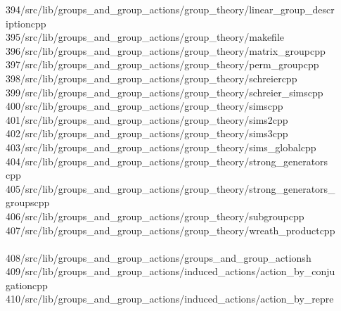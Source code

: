 \begin{tabbing}
394\>/src/lib/groups\_and\_group\_actions/group\_theory/linear\_group\_descr\\[0pt]
\>iptioncpp\\[0pt]
395\>/src/lib/groups\_and\_group\_actions/group\_theory/makefile\\[0pt]
396\>/src/lib/groups\_and\_group\_actions/group\_theory/matrix\_groupcpp\\[0pt]
397\>/src/lib/groups\_and\_group\_actions/group\_theory/perm\_groupcpp\\[0pt]
398\>/src/lib/groups\_and\_group\_actions/group\_theory/schreiercpp\\[0pt]
399\>/src/lib/groups\_and\_group\_actions/group\_theory/schreier\_simscpp\\[0pt]
400\>/src/lib/groups\_and\_group\_actions/group\_theory/simscpp\\[0pt]
401\>/src/lib/groups\_and\_group\_actions/group\_theory/sims2cpp\\[0pt]
402\>/src/lib/groups\_and\_group\_actions/group\_theory/sims3cpp\\[0pt]
403\>/src/lib/groups\_and\_group\_actions/group\_theory/sims\_globalcpp\\[0pt]
404\>/src/lib/groups\_and\_group\_actions/group\_theory/strong\_generators\\[0pt]
\>cpp\\[0pt]
405\>/src/lib/groups\_and\_group\_actions/group\_theory/strong\_generators\_\\[0pt]
\>groupscpp\\[0pt]
406\>/src/lib/groups\_and\_group\_actions/group\_theory/subgroupcpp\\[0pt]
407\>/src/lib/groups\_and\_group\_actions/group\_theory/wreath\_productcpp\\[0pt]
\>\\[0pt]
408\>/src/lib/groups\_and\_group\_actions/groups\_and\_group\_actionsh\\[0pt]
409\>/src/lib/groups\_and\_group\_actions/induced\_actions/action\_by\_conju\\[0pt]
\>gationcpp\\[0pt]
410\>/src/lib/groups\_and\_group\_actions/induced\_actions/action\_by\_repre\\[0pt]

\end{tabbing}
